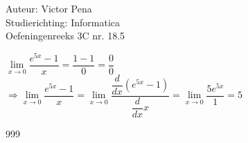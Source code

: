 \documentclass[a4paper]{article}
\newcommand{\dx}{\dfrac{d}{dx}}
\begin{document}
	
	\noindent \large Auteur: Victor Pena \\
	\noindent \large Studierichting: Informatica\\
	\noindent \large Oefeningenreeks 3C nr. 18.5\\
	
	\medskip
	
	\normalsize 
	
	$\lim\limits_{x\to0} \dfrac{e^{5x}-1}{x} = \dfrac{1-1}{0} = \dfrac{0}{0} $\\
	
	$\Rightarrow \lim\limits_{x\to0} \dfrac{e^{5x}-1}{x} = \lim\limits_{x\to0} \dfrac{\dx\left(e^{5x}-1\right)}{\dx x} = \lim\limits_{x\to0}\dfrac{5e^{5x}}{1} = 5 $
	
	
	\begin{thebibliography}{999}
	\end{thebibliography}
\end{document}
